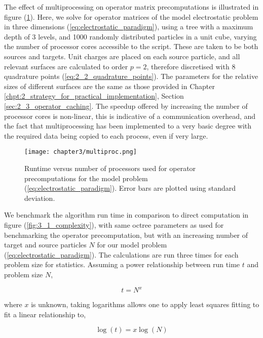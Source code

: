 The effect of multiprocessing on operator matrix precomputations is
illustrated in figure (\ref{fig:3_1_multiproc}). Here, we solve
for operator matrices of the model electrostatic problem in three dimensions
(\ref{eq:electrostatic_paradigm}), using a tree with a maximum depth of 3 levels,
and 1000 randomly distributed particles in a unit cube, varying the number of
processor cores accessible to the script. These are taken to be
both sources and targets. Unit charges are placed on each source particle, and
all relevant surfaces are calculated to order $p=2$, therefore discretised
with 8 quadrature points (\ref{eq:2_2_quadrature_points}). The parameters for
the relative sizes of different surfaces are the same as those provided
in Chapter \ref{chpt:2_strategy_for_practical_implementation},
Section \ref{sec:2_3_operator_caching}. The speedup offered by increasing the
number of processor cores is non-linear, this is indicative of a communication
overhead, and the fact that multiprocessing has been implemented to a very
basic degree with the required data being copied to each process, even if very large.

\begin{figure}[ht]
    \centering

  {\texttt{[image: chapter3/multiproc.png]}}
  \vspace{0pt}
    \caption{Runtime versus number of processors used for operator precomputations
    for the model problem (\ref{eq:electrostatic_paradigm}). Error bars are
    plotted using standard deviation.
    }
    \label{fig:3_1_multiproc}
\end{figure}

We benchmark the algorithm run time in comparison to direct computation in figure
(\ref{fig:3_1_complexity}), with same octree parameters as used for benchmarking
the operator precomputation, but with an increasing number of target and source
particles $N$ for our model problem (\ref{eq:electrostatic_paradigm}). The
calculations are run three times for each problem size for statistics.
Assuming a power relationship between run time $t$ and problem size $N$,

\begin{equation}
    t = N^x
\end{equation}

where $x$ is unknown, taking logarithms allows one to apply least squares fitting
to fit a linear relationship to,

\begin{equation}
    \log(t) = x \log(N)
\end{equation}

